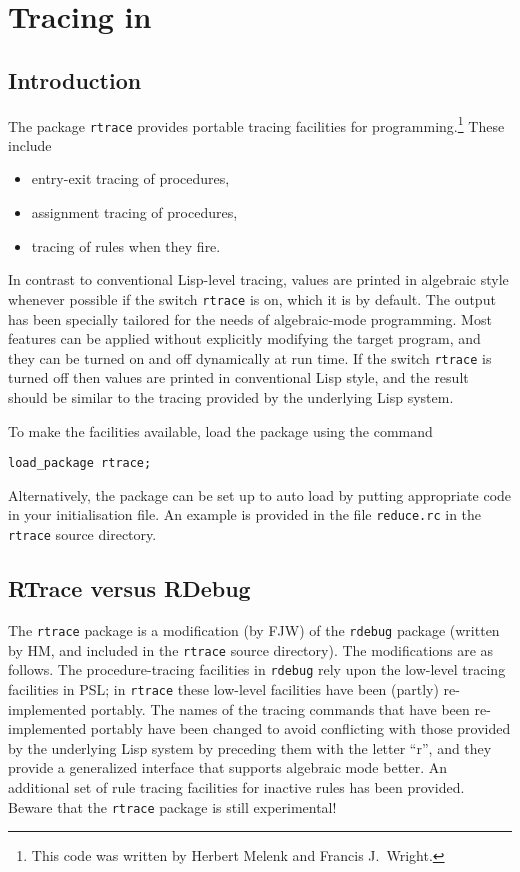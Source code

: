 \chapter{Tracing in \REDUCE}
\newcommand{\rdebug}{\texttt{rdebug}}
\newcommand{\rtrace}{\texttt{rtrace}}


\section{Introduction}

The package \rtrace{} provides portable tracing facilities for
\REDUCE{} programming.\footnote{This code was written by Herbert Melenk and Francis J.~Wright.}
These include
\begin{itemize}
\item entry-exit tracing of procedures,
\item assignment tracing of procedures,
\item tracing of rules when they fire.
\end{itemize}
In contrast to conventional Lisp-level tracing, values are printed in
algebraic style whenever possible if the switch \rtrace{} is
on, which
it is by default.  The output has been specially tailored for the
needs of algebraic-mode programming.  Most features can be applied
without explicitly modifying the target program, and they can be
turned on and off dynamically at run time.  If the switch \rtrace{} is
turned off then values are printed in conventional Lisp style, and the
result should be similar to the tracing provided by the underlying
Lisp system.

To make the facilities available, load the package using the command
\begin{verbatim}
load_package rtrace;
\end{verbatim}
Alternatively, the package can be set up to auto load by putting
appropriate code in your \REDUCE{} initialisation file.  An example is
provided in the file \texttt{reduce.rc} in the \rtrace{} source
directory.

\section{RTrace versus RDebug}

The \rtrace{} package is a modification (by FJW) of the \rdebug{}
package (written by HM, and included in the \rtrace{} source
directory).  The modifications are as follows.  The procedure-tracing
facilities in \rdebug{} rely upon the low-level tracing facilities in
PSL; in \rtrace{} these low-level facilities have been (partly)
re-implemented portably.  The names of the tracing commands that have
been re-implemented portably have been changed to avoid conflicting
with those provided by the underlying Lisp system by preceding them
with the letter ``r'', and they provide a generalized interface that
supports algebraic mode better.  An additional set of rule tracing
facilities for inactive rules has been provided.  Beware that the
\rtrace{} package is still experimental!

